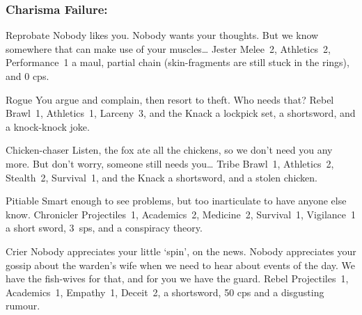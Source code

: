 \begin{multicols}{2}
\begin{itemize}
\end{itemize}

\needspace{10em}
\subsubsection{Charisma Failure:}

\begin{itemize}

  {Reprobate}%
  {Nobody likes you.
  Nobody wants your thoughts.
  But we know somewhere that can make use of your muscles\ldots
  }%
  {Jester}%
  {Melee~2, Athletics~2, Performance~1}%
  {a maul, partial chain (skin-fragments are still stuck in the rings), and 0 \glspl{cp}.}%

  {Rogue}%
  {You argue and complain, then resort to theft.
  Who needs that?
  }%
  {Rebel}%
  {Brawl~1, Athletics~1, Larceny~3, and the Knack \lucky}%
  {a lockpick set, a shortsword, and a knock-knock joke.}%

  {Chicken-chaser}%
  {Listen, the fox ate all the chickens, so we don't need you any more.
  But don't worry, someone still needs you\ldots
  }%
  {Tribe}%
  {Brawl~1, Athletics~2, Stealth~2, Survival~1, and the Knack \lucky}%
  {a shortsword, and a stolen chicken.}%

  {Pitiable}%
  {Smart enough to see problems, but too inarticulate to have anyone else know.
  }%
  {Chronicler}%
  {Projectiles~1, Academics~2, Medicine~2, Survival~1, Vigilance~1}%
  {a short sword, 3~\glspl{sp}, and a conspiracy theory.}%

  {Crier}%
  {Nobody appreciates your little `spin', on the news.
  Nobody appreciates your gossip about the warden's wife when we need to hear about events of the day.
  We have the fish-wives for that, and for you we have the \gls{guard}.
  }%
  {Rebel}%
  {Projectiles~1, Academics~1, Empathy~1, Deceit~2, }%
  {a shortsword, 50 \glspl{cp} and a disgusting rumour.}%

\end{itemize}

\end{multicols}

